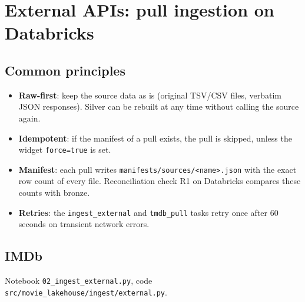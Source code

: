 \documentclass[12pt,a4paper]{article}
\newcommand{\code}[1]{\texttt{#1}}
\begin{document}
\section{External APIs: pull ingestion on Databricks}

\subsection{Common principles}
\begin{itemize}
  \item \textbf{Raw-first}: keep the source data as is (original TSV/CSV files, verbatim JSON responses). Silver can be
        rebuilt at any time without calling the source again.
  \item \textbf{Idempotent}: if the manifest of a pull exists, the pull is skipped, unless the widget
        \code{force=true} is set.
  \item \textbf{Manifest}: each pull writes \code{manifests/sources/<name>.json} with the exact row count of every
        file. Reconciliation check R1 on Databricks compares these counts with bronze.
  \item \textbf{Retries}: the \code{ingest\_external} and \code{tmdb\_pull} tasks retry once after 60 seconds on
        transient network errors.
\end{itemize}

\subsection{IMDb}
Notebook \code{02\_ingest\_external.py}, code \code{src/movie\_lakehouse/ingest/external.py}.
\end{document}
